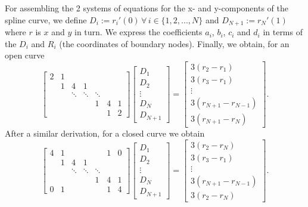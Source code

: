 For assembling the 2 systems of equations for the x- and y-components of the spline curve, we define $D_i := r_i'(0) \, \forall \, i \in \{1,2,...,N\}$ and $D_{N+1} := r_N'(1)$ where $r$ is $x$ and $y$ in turn. We express the coefficients $a_i$, $b_i$, $c_i$ and $d_i$ in terms of the $D_i$ and $R_i$ (the coordinates of boundary nodes). Finally, we obtain, for an open curve
\begin{equation}
\begin{bmatrix}
2 & 1 & & & & & \\
 & 1 & 4 & 1 & & & \\
 & & \ddots & \ddots & \ddots & &\\
 & & & & 1 & 4 & 1 \\
 & & & & & 1 & 2
\end{bmatrix}
\begin{bmatrix}
D_1 \\
D_2 \\
\vdots \\
D_N \\
D_{N+1}
\end{bmatrix}
=
\begin{bmatrix}
3(r_2 - r_1) \\
3(r_3 - r_1) \\
\vdots \\
3(r_{N+1}-r_{N-1}) \\
3(r_{N+1} - r_N)
\end{bmatrix}.
\end{equation}
After a similar derivation, for a closed curve we obtain
\begin{equation}
\begin{bmatrix}
4 & 1 & & & & 1 & 0 \\
& 1 & 4 & 1 & & & \\
& & \ddots & \ddots & \ddots & &\\
& & & & 1 & 4 & 1 \\
0 &1 & & & & 1 & 4
\end{bmatrix}
\begin{bmatrix}
D_1 \\
D_2 \\
\vdots \\
D_N \\
D_{N+1}
\end{bmatrix}
=
\begin{bmatrix}
3(r_2 - r_{N}) \\
3(r_3 - r_1) \\
\vdots \\
3(r_{N+1}-r_{N-1}) \\
3(r_2 - r_N)
\end{bmatrix}.
\end{equation}

